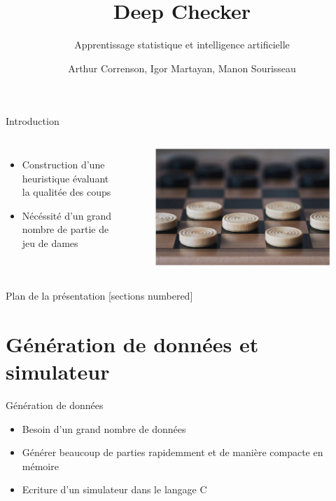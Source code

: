 \documentclass{beamer}
\title{Deep Checker}
\subtitle{Apprentissage statistique et intelligence artificielle}
\date{}
\author{Arthur Correnson, Igor Martayan, Manon Sourisseau}
\institute{Projet de Statistiques, ENS, 2021}
\begin{document}
{\maketitle}

  \begin{frame}{Introduction}
    \begin{columns}
        \begin{itemize}
            \item Construction d'une \alert{heuristique} évaluant la qualitée des coups
            \item Nécéssité d'un grand nombre de partie de jeu de dames
        \end{itemize}
        \begin{figure}
            \centering
            \includegraphics[width=\columnwidth]{im/dames.png}
        \end{figure}
    \end{columns}
  \end{frame}

  \begin{frame}{Plan de la présentation}
    [sections numbered]
    \tableofcontents
\end{frame}

{\section{Génération de données et simulateur}}
\begin{frame}{Génération de données}
    \begin{itemize}
        \item Besoin d'un \alert{grand nombre de données}
        \item Générer beaucoup de parties \alert{rapidemment} et de manière \alert{compacte} en mémoire
        \item Ecriture d'un simulateur dans le langage \alert{C}
    \end{itemize}
\end{frame}
\end{document}
